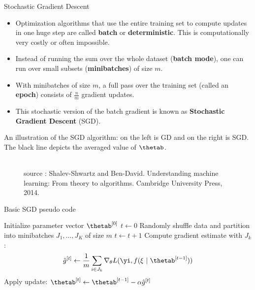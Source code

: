 \begin{vbframe}{Stochastic Gradient Descent}
\begin{itemize}
\lz
\item Optimization algorithms that use the entire training set to compute updates in one huge step are called \textbf{batch} or \textbf{deterministic}. This is computationally very costly or often impossible.
\lz
\item Instead of running the sum over the whole dataset (\textbf{batch mode}), one can run over small subsets (\textbf{minibatches}) of size $m$.
\lz
\item With minibatches of size $m$, a full pass over the training set (called an \textbf{epoch}) consists of $\frac{n}{m}$ gradient updates.
\lz
\item This stochastic version of the batch gradient is known as \textbf{Stochastic Gradient Descent} (SGD).
\end{itemize}
\framebreak

An illustration of the SGD algorithm: on the left is GD and on the right is SGD. The black line depicts the averaged value of $\thetab$.

\begin{figure}
\tiny{\\ source : Shalev-Shwartz and  Ben-David.
Understanding machine learning: From theory to algorithms. Cambridge University Press, 2014.}
\end{figure}
\framebreak

  \begin{algorithm}[H]
  \footnotesize
    \caption{Basic SGD pseudo code}
    \begin{algorithmic}[1]
    \State Initialize parameter vector $\thetab^{[0]}$
    \State $t \leftarrow 0$
    \State Randomly shuffle data and partition into minibatches $J_1, ..., J_K$ of size $m$
      \State $t \leftarrow t + 1$
      \State Compute gradient estimate with $J_k$:
      \[\hat{g}^{[t]} \leftarrow \frac{1}{m} \sum_{i \in J_k} \nabla_\theta L(\yi, f(\xi ~|~ \thetab^{[t-1]}))
      \]
      \State Apply update: $\thetab^{[t]} \leftarrow \thetab^{[t-1]} - \alpha \hat{g}^{[t]}$
      \EndFor
      \EndWhile
    \end{algorithmic}
  \end{algorithm}
\end{vbframe}
